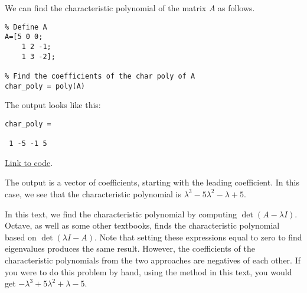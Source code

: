 \documentclass{ximera}
\begin{document}
\begin{template}\label{temp:charPoly}
    We can find the characteristic polynomial of the matrix $A$ as follows.

    \begin{verbatim}
% Define A
A=[5 0 0; 
    1 2 -1; 
    1 3 -2];

% Find the coefficients of the char poly of A
char_poly = poly(A)
    \end{verbatim}

The output looks like this:

\begin{verbatim}
char_poly =

 1 -5 -1 5
\end{verbatim}

\href{https://sagecell.sagemath.org/?z=eJxTVXBJTcvMS1Vw5OVytI02VTBQMLBW4OVSAAJDBSMFXUMEz1hB1yjWmpeLl0tVwS0zL0WhJCNVITk_NS0tMzkzNa-kWCE_DSKWkVikUJCfUwkSABoM4seD-bZgYQ1HTQCF1h-X&lang=octave&interacts=eJyLjgUAARUAuQ==}{Link to code}.

The output is a vector of coefficients, starting with the leading coefficient.  In this case, we see that the characteristic polynomial is $\lambda^3-5\lambda^2-\lambda+5$.

\begin{warning}
    In this text, we find the characteristic polynomial by computing $\det{\left(A-\lambda I\right)}$.  Octave, as well as some other textbooks, finds the characteristic polynomial based on $\det{\left(\lambda I-A\right)}$.  Note that setting these expressions equal to zero to find eigenvalues produces the same result. However, the coefficients of the characteristic polynomials from the two approaches are negatives of each other.  If you were to do this problem by hand, using the method in this text, you would get $-\lambda^3+5\lambda^2+\lambda-5$.
\end{warning}
\end{template}
\end{document}

